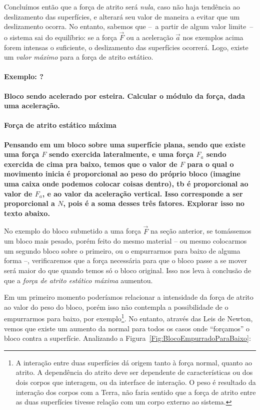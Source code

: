 Concluímos então que a força de atrito será \emph{nula}, caso não haja tendência ao deslizamento das superfícies, e alterará seu valor de maneira a evitar que um deslizamento ocorra. No entanto, sabemos que --~a partir de algum valor limite~-- o sistema sai do equilíbrio: se a força $\vec{F}$ ou a aceleração $\vec{a}$ nos exemplos acima forem intensas o suficiente, o deslizamento das superfícies ocorrerá. Logo, existe um \emph{valor máximo} para a força de atrito estático.

\paragraph{Exemplo: ?}

\textbf{Bloco sendo acelerado por esteira. Calcular o módulo da força, dada uma aceleração.}

\paragraph{Força de atrito estático máxima} 

\textbf{Pensando em um bloco sobre uma superfície plana, sendo que existe uma força $F$ sendo exercida lateralmente, e uma força $F_a$ sendo exercida de cima pra baixo, temos que o valor de $F$ para o qual o movimento inicia é proporcional ao peso do próprio bloco (imagine uma caixa onde podemos colocar coisas dentro), tb é proporcional ao valor de $F_a$, e ao valor da aceleração vertical. Isso corresponde a ser proporcional a $N$, pois é a soma desses três fatores. Explorar isso no texto abaixo.}

No exemplo do bloco submetido a uma força $\vec{F}$ na seção anterior, se tomássemos um bloco mais pesado, porém feito do mesmo material -- ou mesmo colocarmos um segundo bloco sobre o primeiro, ou o empurrarmos para baixo de alguma forma --, verificaremos que a força necessária para que o bloco passe a se mover será maior do que quando temos só o bloco original. Isso nos leva à conclusão de que a \emph{força de atrito estático máxima} aumentou.

Em um primeiro momento poderíamos relacionar a intensidade da força de atrito ao valor do peso do bloco, porém isso não contempla a possibilidade de o empurrarmos para baixo, por exemplo\footnote{A interação entre duas superfícies dá origem tanto à força normal, quanto ao atrito. A dependência do atrito deve ser dependente de características ou dos dois corpos que interagem, ou da interface de interação. O peso é resultado da interação dos corpos com a Terra, não faria sentido que a força de atrito entre as duas superfícies tivesse relação com um corpo externo ao sistema.}. No entanto, através das Leis de Newton, vemos que existe um aumento da normal para todos os casos onde ``forçamos'' o bloco contra a superfície. Analizando a Figura~\ref{Fig:BlocoEmpurradoParaBaixo}:

